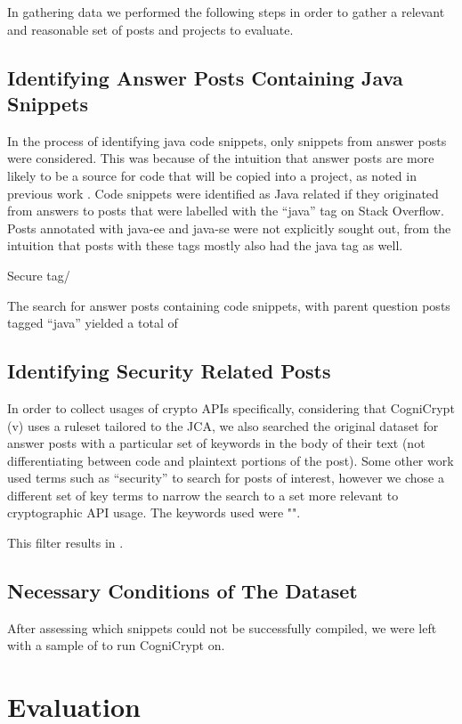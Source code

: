 \documentclass[10pt, conference]{IEEEtran}
\begin{document}
In gathering data we performed the following steps in order to gather a relevant and reasonable set of posts and projects to evaluate.

\subsection{Identifying Answer Posts Containing Java Snippets}
In the process of identifying java code snippets, only snippets from answer posts were considered. This was because of the intuition that answer posts are more likely to be a source for code that will be copied into a project, as noted in previous work \cite{7958574}. Code snippets were identified as Java related if they originated from answers to posts that were labelled with the “java” tag on Stack Overflow. Posts annotated with java-ee and java-se were not explicitly sought out, from the intuition that posts with these tags mostly also had the java tag as well.

Secure tag/

The search for answer posts containing code snippets, with parent question posts tagged “java” yielded a total of 

\subsection{Identifying Security Related Posts}
In order to collect usages of crypto APIs specifically, considering that CogniCrypt (v) uses a ruleset tailored to the JCA, we also searched the original dataset for answer posts with a particular set of keywords in the body of their text (not differentiating between code and plaintext portions of the post). Some other work \cite{Meng:2018:SCP:3180155.3180201} used terms such as “security” to search for posts of interest, however we chose a different set of key terms to narrow the search to a set more relevant to cryptographic API usage. The keywords used were "". 

This filter results in .
 

\subsection{Necessary Conditions of The Dataset}


After assessing which snippets could not be successfully compiled, we were left with a sample of to run CogniCrypt on. 

\section{Evaluation}
\end{document}
